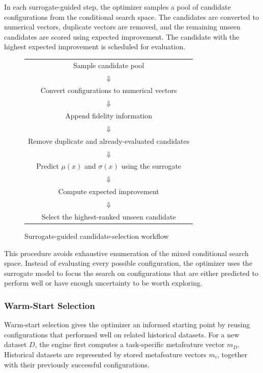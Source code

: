 \documentclass[12pt,a4paper]{report}
\begin{document}
\noindent In each surrogate-guided step, the optimizer samples a pool of candidate
configurations from the conditional search space. The candidates are converted
to numerical vectors, duplicate vectors are removed, and the remaining unseen
candidates are scored using expected improvement. The candidate with the highest
expected improvement is scheduled for evaluation.

\begin{figure}[H]
\centering
\renewcommand{\arraystretch}{1.25}
\begin{tabular}{c}
Sample candidate pool \\
\(\Downarrow\) \\
Convert configurations to numerical vectors \\
\(\Downarrow\) \\
Append fidelity information \\
\(\Downarrow\) \\
Remove duplicate and already-evaluated candidates \\
\(\Downarrow\) \\
Predict \(\mu(x)\) and \(\sigma(x)\) using the surrogate \\
\(\Downarrow\) \\
Compute expected improvement \\
\(\Downarrow\) \\
Select the highest-ranked unseen candidate
\end{tabular}
\caption{Surrogate-guided candidate-selection workflow}
\label{fig:gp-automl-surrogate-candidate-selection}
\end{figure}

\noindent This procedure avoids exhaustive enumeration of the mixed conditional search
space. Instead of evaluating every possible configuration, the optimizer uses the
surrogate model to focus the search on configurations that are either predicted
to perform well or have enough uncertainty to be worth exploring.

\subsubsection{Warm-Start Selection}

Warm-start selection gives the optimizer an informed starting point by reusing
configurations that performed well on related historical datasets. For a new
dataset \(D\), the engine first computes a task-specific metafeature vector
\(m_D\). Historical datasets are represented by stored metafeature vectors
\(m_i\), together with their previously successful configurations.
\end{document}
